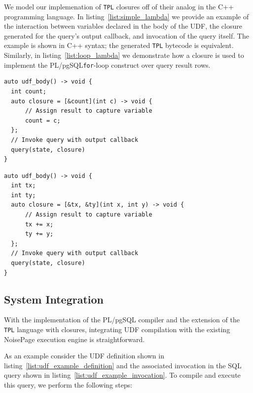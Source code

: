 \documentclass{vldb}
\newcommand{\tpl}{\texttt{TPL}\xspace}
\newcommand{\plpgsql}{PL/pgSQL\xspace}
\begin{document}
We model our implemenation of \tpl closures off of their analog in the C++ programming language. In listing~\ref{list:simple_lambda} we provide an example of the interaction between variables declared in the body of the UDF, the closure generated for the query's output callback, and invocation of the query itself. The example is shown in C++ syntax; the generated \tpl bytecode is equivalent. Similarly, in listing~\ref{list:loop_lambda} we demonstrate how a closure is used to implement the \plpgsql \texttt{for}-loop construct over query result rows.

\begin{listing}
    \begin{verbatim}
auto udf_body() -> void {
  int count;
  auto closure = [&count](int c) -> void {
      // Assign result to capture variable
      count = c;
  };
  // Invoke query with output callback
  query(state, closure)
}
    \end{verbatim}
    \caption{The C++ representation of the closure generated to handle embedded queries with only a single result row.}
    \label{list:simple_lambda}
\end{listing}

\begin{listing}
    \begin{verbatim}
auto udf_body() -> void {
  int tx;
  int ty;
  auto closure = [&tx, &ty](int x, int y) -> void {
      // Assign result to capture variable
      tx += x;
      ty += y;
  };
  // Invoke query with output callback
  query(state, closure)
}
    \end{verbatim}
    \caption{The C++ representation of the closure generated to implement a \texttt{for}-loop over embedded query result rows.}
    \label{list:loop_lambda}
\end{listing}


\subsection{System Integration}

With the implementation of the \plpgsql compiler and the extension of the \tpl language with closures, integrating UDF compilation with the existing NoisePage execution engine is straightforward.

As an example consider the UDF definition shown in listing~\ref{list:udf_example_definition} and the associated invocation in the SQL query shown in listing~\ref{list:udf_example_invocation}. To compile and execute this query, we perform the following steps:
\end{document}
